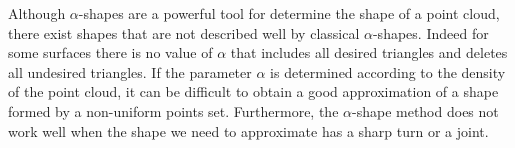 \indent Although $\alpha$-shapes are a powerful tool for determine the shape of a point cloud, there exist shapes that are not described well by classical $ \alpha $-shapes. Indeed for some surfaces there is no value of $\alpha$ that includes all desired triangles and deletes all undesired triangles. If the parameter $\alpha$ is determined according to the density of the point cloud, it can be difficult to obtain a good approximation of a shape formed by a non-uniform points set. Furthermore, the $\alpha$-shape method does not work well when the shape we need to approximate has a sharp turn or a joint. 

